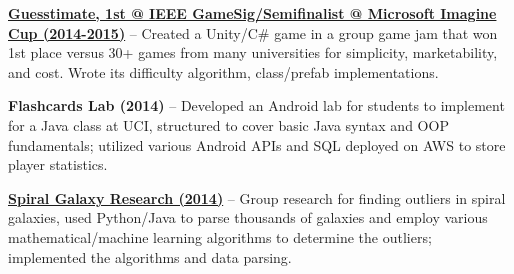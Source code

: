 \documentclass[letterpaper,MMMyyyy,nonstopmode]{simpleresumecv}
\begin{document}
\begin{Body}
\Entry
\BulletItem
\href{https://github.com/brendonwai/PAS}
{\textbf{Guesstimate, 1st @ IEEE GameSig/Semifinalist @ Microsoft Imagine Cup (2014-2015)}} -- Created a Unity/C\# game in a group game jam that won 1st place versus 30+ games from many universities for simplicity, marketability, and cost. Wrote its difficulty algorithm, class/prefab implementations.\newline

\Entry
\BulletItem
{\textbf{Flashcards Lab (2014)}} -- Developed an Android lab for students to implement for a Java class at UCI, structured to cover basic Java syntax and OOP fundamentals; utilized various Android APIs and SQL deployed on AWS to store player statistics.\newline

\Entry
\BulletItem
\href{https://github.com/SVT125/Research-CS199}
{\textbf{Spiral Galaxy Research (2014)}} -- Group research for finding outliers in spiral galaxies, used Python/Java to parse thousands of galaxies and employ various mathematical/machine learning algorithms to determine the outliers; implemented the algorithms and data parsing.\newline

\end{Body}
\end{document}

